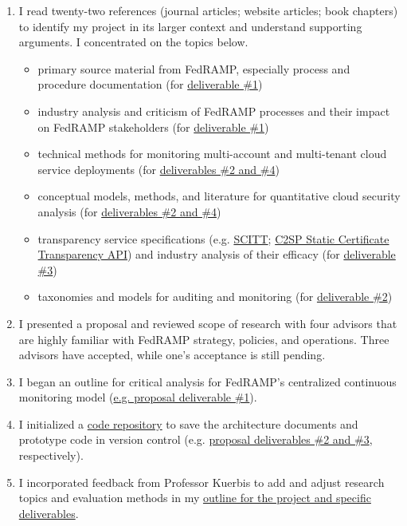 \documentclass{jdf}
\begin{document}
\begin{enumerate}
    \item I read twenty-two references (journal articles; website articles; book chapters) to identify my project in its larger context and understand supporting arguments. I concentrated on the topics below.
        \begin{itemize}
            \item primary source material from FedRAMP, especially process and procedure documentation (for  \hyperlink{https://github.com/aj-stein/practicum_proposal/blob/main/paper.pdf}{deliverable \#1})
            \item industry analysis and criticism of FedRAMP processes and their impact on FedRAMP stakeholders (for  \hyperlink{https://github.com/aj-stein/practicum_proposal/blob/main/paper.pdf}{deliverable \#1})
            \item technical methods for monitoring multi-account and multi-tenant cloud service deployments (for  \hyperlink{https://github.com/aj-stein/practicum_proposal/blob/main/paper.pdf}{deliverables \#2 and \#4})
            \item conceptual models, methods, and literature for quantitative cloud security analysis (for  \hyperlink{https://github.com/aj-stein/practicum_proposal/blob/main/paper.pdf}{deliverables \#2 and \#4})
            \item transparency service specifications (e.g. \hyperlink{https://datatracker.ietf.org/doc/draft-ietf-scitt-architecture/}{SCITT}; \hyperlink{https://c2sp.org/static-ct-api}{C2SP Static Certificate Transparency API}) and industry analysis of their efficacy (for  \hyperlink{https://github.com/aj-stein/practicum_proposal/blob/main/paper.pdf}{deliverable \#3})
            \item taxonomies and models for auditing and monitoring (for  \hyperlink{https://github.com/aj-stein/practicum_proposal/blob/main/paper.pdf}{deliverable \#2})
        \end{itemize}
    \item I presented a proposal and reviewed scope of research with four advisors that are highly familiar with FedRAMP strategy, policies, and operations. Three advisors have accepted, while one's acceptance is still pending.
    \item I began an outline for critical analysis for FedRAMP's centralized continuous monitoring model (\hyperlink{https://github.com/aj-stein/practicum_proposal/blob/main/paper.pdf}{e.g. proposal deliverable \#1}).
    \item I initialized a \hyperlink{https://github.com/aj-stein/conmotion.git}{code repository} to save the architecture documents and prototype code in version control (e.g. \hyperlink{https://github.com/aj-stein/practicum_proposal/blob/main/paper.pdf}{proposal deliverables \#2 and \#3}, respectively).
    \item I incorporated feedback from Professor Kuerbis to add and adjust research topics and evaluation methods in my \hyperlink{https://github.com/aj-stein/practicum/blob/main/notes.pdf}{outline for the project and specific deliverables}.
\end{enumerate}
\end{document}
